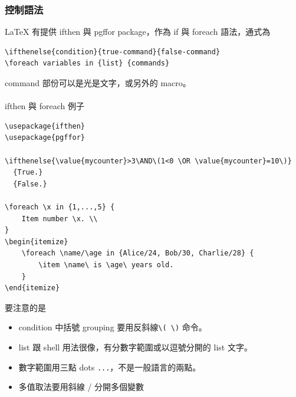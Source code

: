     \subsubsection{控制語法}
    \LaTeX{} 有提供 ifthen 與 pgffor package，作為 if 與 foreach 語法，通式為
    \begin{verbatim}
\ifthenelse{condition}{true-command}{false-command}
\foreach variables in {list} {commands}
    \end{verbatim}
    command 部份可以是光是文字，或另外的 macro。
    \\\\
    ifthen 與 foreach  例子
    \begin{verbatim}
\usepackage{ifthen}
\usepackage{pgffor}

\ifthenelse{\value{mycounter}>3\AND\(1<0 \OR \value{mycounter}=10\)}
  {True.}
  {False.}

\foreach \x in {1,...,5} {
    Item number \x. \\
}
\begin{itemize}
    \foreach \name/\age in {Alice/24, Bob/30, Charlie/28} {
        \item \name\ is \age\ years old.
    }
\end{itemize}
    \end{verbatim}
    要注意的是
    \begin{itemize}
      \item condition 中括號 grouping 要用反斜線\verb=\( \)= 命令。
      \item list 跟 shell 用法很像，有分數字範圍或以逗號分開的 list 文字。
      \item 數字範圍用三點 dots \verb=...=，不是一般語言的兩點。
      \item 多值取法要用斜線 / 分開多個變數
    \end{itemize}

